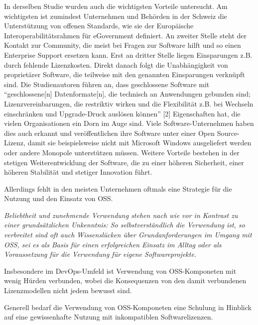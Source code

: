 In derselben Studie wurden auch die wichtigsten Vorteile untersucht. Am wichtigsten ist zumindest Unternehmen und Behörden in der Schweiz die Unterstützung von offenen Standards, wie sie der Europäische Interoperabilitätsrahmen für eGovernment
definiert. An zweiter Stelle steht der Kontakt zur Community, die meist bei Fragen zur Software hilft und so
einen Enterprise Support ersetzen kann. Erst an dritter Stelle liegen Einsparungen z.B. durch fehlende Lizenzkosten. Direkt danach folgt die Unabhängigkeit von proprietärer Software, die teilweise mit den genannten Einsparungen verknüpft sind.
Die Studienautoren führen an, dass geschlossene Software mit “geschlossene[n] Datenformate[n], die technisch an Anwendungen gebunden sind; Lizenzvereinbarungen, die restriktiv wirken und die Flexibilität z.B. bei Wechseln einschränken und
Upgrade-Druck auslösen können” [2] Eigenschaften hat, die vielen Organisationen ein Dorn im Auge sind. Viele Software-Unternehmen haben dies auch erkannt und veröffentlichen ihre Software unter einer Open Source-Lizenz, damit sie beispielsweise nicht mit Microsoft Windows ausgeliefert werden oder andere Monopole unterstützen müssen. Weitere Vorteile bestehen in der stetigen Weiterentwicklung der Software, die zu einer höheren Sicherheit, einer höheren Stabilität und stetiger Innovation führt.











Allerdings fehlt in den meisten Unternehmen oftmals eine Strategie für die Nutzung und den Einsatz von OSS. 

\textit{Beliebtheit und zunehmende Verwendung stehen nach wie vor in Kontrast zu
einer grundsätzlichen Unkenntnis: So selbstverständlich die Verwendung ist, so verbreitet sind
oft auch Wissenslücken über Grundanforderungen im Umgang mit OSS, sei es als Basis für einen
erfolgreichen Einsatz im Alltag oder als Voraussetzung für die Verwendung für eigene Softwareprojekte.} \cite{bitkom_ev_open_2016}

Insbesondere im DevOps-Umfeld ist Verwendung von OSS-Komponeten mit wenig Hürden verbunden, wobei die Konsequenzen von den damit verbundenen Lizenzmodellen nicht jedem bewusst sind. 

Generell bedarf die Verwendung von OSS-Komponeten eine Schulung in Hinblick auf eine gewissenhafte Nutzung mit inkompatiblen Softwarelizenzen. 
















